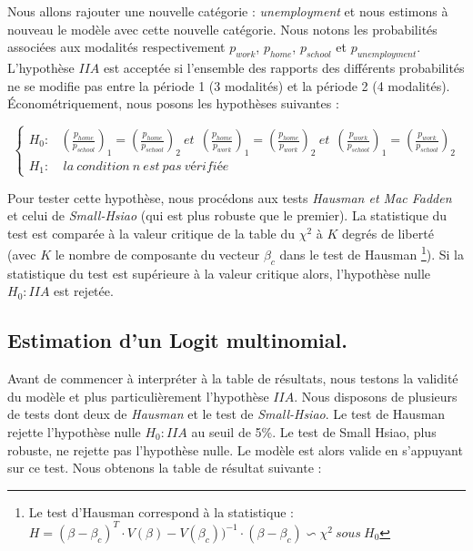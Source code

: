 Nous allons rajouter une nouvelle catégorie : \emph{unemployment} et nous estimons à nouveau le modèle avec cette nouvelle catégorie. Nous notons les probabilités associées aux modalités respectivement $p_{work}$, $p_{home}$, $p_{school}$ et $p_{unemployment}$. L'hypothèse $IIA$ est acceptée si l'ensemble des rapports des différents probabilités ne se modifie pas entre la période 1 (3 modalités) et la période 2 (4 modalités). Économétriquement, nous posons les hypothèses suivantes : 

\begin{equation*}
	\left\lbrace
		\begin{aligned}
            H_0 :& \left( {\frac{p_{home}}{p_{school}}} \right)_1 = \left( {\frac{p_{home}}{p_{school}}} \right)_2 \: et \: \: \left( {\frac{p_{home}}{p_{work}}} \right)_1 = \left({\frac{p_{home}}{p_{work}}} \right)_2 \: et \: \: \left({\frac{p_{work}}{p_{school}}}\right)_1 = \left({\frac{p_{work}}{p_{school}}}\right)_2 \\ 
            H_1 :& \: la \: condition \: n \: est \: pas  \: vérifiée
		\end{aligned}
	\right.
\end{equation*}

Pour tester cette hypothèse, nous procédons aux tests \emph{Hausman et Mac Fadden} et celui de \emph{Small-Hsiao} (qui est plus robuste que le premier). La statistique du test est comparée à la valeur critique de la table du $\chi^2$ à $K$ degrés de liberté (avec $K$ le nombre de composante du vecteur $\beta_c$ dans le test de Hausman \footnote{Le test d'Hausman correspond à la statistique : $H = (\beta - \beta_c)^T \cdot V(\beta)-V(\beta_c)) ^{-1} \cdot (\beta - \beta_c) \backsim \chi^2 \: sous \: H_0$}). Si la statistique du test est supérieure à la valeur critique alors, l'hypothèse nulle $H_0 : IIA$ est rejetée. 


\subsection{Estimation d'un Logit multinomial.}

Avant de commencer à interpréter à la table de résultats, nous testons la validité du modèle et plus particulièrement l’hypothèse $IIA$. Nous disposons de plusieurs de tests dont deux de \emph{Hausman} et le test de \emph{Small-Hsiao}. Le test de Hausman rejette l’hypothèse nulle $H_0 : IIA$ au seuil de 5\%. Le test de Small Hsiao, plus robuste, ne rejette pas l’hypothèse nulle. Le modèle est alors valide en s’appuyant sur ce test.
Nous obtenons la table de résultat suivante : 

